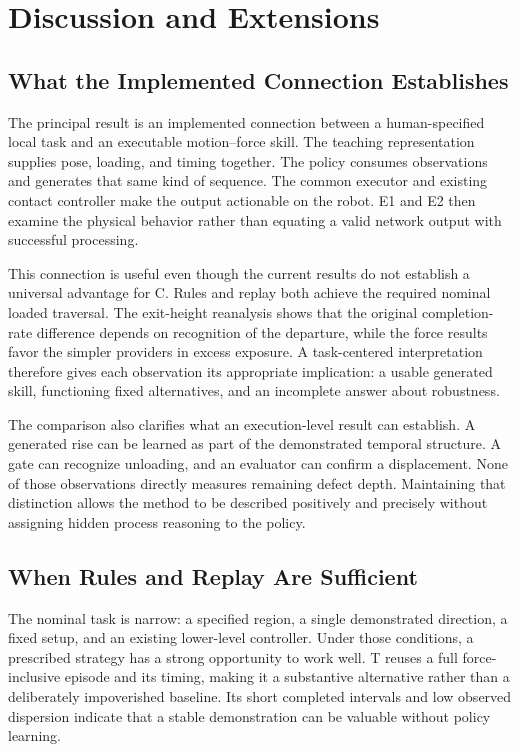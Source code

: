 \chapter{Discussion and Extensions}
\label{chap:discussion}

\section{What the Implemented Connection Establishes}
The principal result is an implemented connection between a human-specified local task and an executable motion--force skill. The teaching representation supplies pose, loading, and timing together. The policy consumes observations and generates that same kind of sequence. The common executor and existing contact controller make the output actionable on the robot. E1 and E2 then examine the physical behavior rather than equating a valid network output with successful processing.

This connection is useful even though the current results do not establish a universal advantage for C. Rules and replay both achieve the required nominal loaded traversal. The exit-height reanalysis shows that the original completion-rate difference depends on recognition of the departure, while the force results favor the simpler providers in excess exposure. A task-centered interpretation therefore gives each observation its appropriate implication: a usable generated skill, functioning fixed alternatives, and an incomplete answer about robustness.

The comparison also clarifies what an execution-level result can establish. A generated rise can be learned as part of the demonstrated temporal structure. A gate can recognize unloading, and an evaluator can confirm a displacement. None of those observations directly measures remaining defect depth. Maintaining that distinction allows the method to be described positively and precisely without assigning hidden process reasoning to the policy.

\section{When Rules and Replay Are Sufficient}
The nominal task is narrow: a specified region, a single demonstrated direction, a fixed setup, and an existing lower-level controller. Under those conditions, a prescribed strategy has a strong opportunity to work well. T reuses a full force-inclusive episode and its timing, making it a substantive alternative rather than a deliberately impoverished baseline. Its short completed intervals and low observed dispersion indicate that a stable demonstration can be valuable without policy learning.


